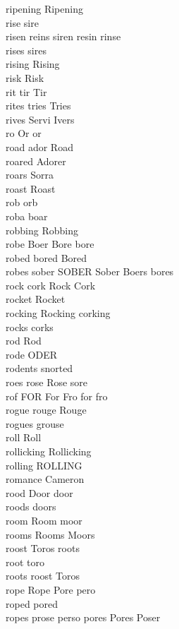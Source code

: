 ripening Ripening\\
rise sire\\
risen reins siren resin rinse\\
rises sires\\
rising Rising\\
risk Risk\\
rit tir Tir\\
rites tries Tries\\
rives Servi Ivers\\
ro Or or\\
road ador Road\\
roared Adorer\\
roars Sorra\\
roast Roast\\
rob orb\\
roba boar\\
robbing Robbing\\
robe Boer Bore bore\\
robed bored Bored\\
robes sober SOBER Sober Boers bores\\
rock cork Rock Cork\\
rocket Rocket\\
rocking Rocking corking\\
rocks corks\\
rod Rod\\
rode ODER\\
rodents snorted\\
roes rose Rose sore\\
rof FOR For Fro for fro\\
rogue rouge Rouge\\
rogues grouse\\
roll Roll\\
rollicking Rollicking\\
rolling ROLLING\\
romance Cameron\\
rood Door door\\
roods doors\\
room Room moor\\
rooms Rooms Moors\\
roost Toros roots\\
root toro\\
roots roost Toros\\
rope Rope Pore pero\\
roped pored\\
ropes prose perso pores Pores Poser\\
